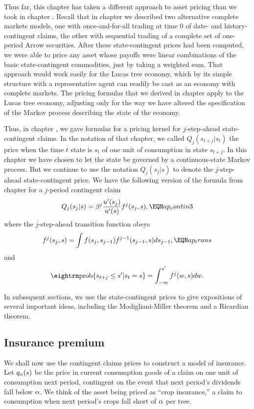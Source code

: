   Thus far, this chapter has taken a different approach to
asset pricing than we took in chapter .  Recall that in
chapter  we described two alternative complete markets
models, one with once-and-for-all trading at time $0$ of date- and
history-contingent claims, the other with sequential
trading of a complete set of one-period Arrow securities.
After these state-contingent prices had been computed, we
were able to price any asset whose payoffs were linear
combinations of the basic state-contingent commodities, just
by taking a weighted sum.  That approach would  work easily
for the Lucas tree economy, which by its simple structure
with a representative agent can readily be cast as an economy
with complete markets. The pricing formulas
that we derived in chapter  apply to the Lucas tree economy,
adjusting only for the way we have altered the specification
of the Markov process describing the state of the economy.

  Thus, in chapter , we gave formulas for a pricing kernel for
 $j$-step-ahead
state-contingent claims.  In the notation
of that chapter, we called $Q_j(s_{t+j} | s_t)$  the price
when the time $t$ state is $s_t$
of one unit of consumption in state $s_{t+j}$.   In this
chapter we have chosen to let the state
be governed by a continuous-state   Markov process.
But we continue to use the notation $Q_j(s_j | s)$ to denote
the $j$-step-ahead state-contingent price.  We have the
following version of the formula from chapter   for
a $j$-period contingent claim
$$Q_j (s_j|s)=\be^j {u'(s_j)\over u'(s)} f^j (s_j,s),     \EQN ap_contin3$$
where the $j$-step-ahead transition function obeys
$$f^j(s_j,s)=\int f(s_j,s_{j-1}) f^{j-1}(s_{j-1},s)ds_{j-1}, \EQN ap_trans
$$
and
$$
{\rm prob}\{s_{t+j}\le s'|s_t=s\}=\int_{-\infty}^{s'} f^j (w,s)dw.
$$

  In subsequent sections, we use the state-contingent prices to give
expositions of several important ideas, including the Modigliani-Miller
theorem and a Ricardian theorem.

\subsection{Insurance premium}

We shall now use the contingent claims prices to construct a model of
insurance.  Let $q_\alpha(s)$ be
the  price in current consumption goods of a claim on one unit of consumption
next period, contingent on the event that next period's dividends fall below
$\alpha$.  We think of the asset being priced as ``crop insurance,'' a claim to
consumption when next period's crops fall short of $\alpha$ per tree.

